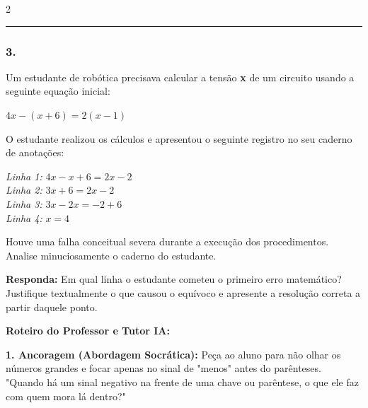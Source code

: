 \begin{multicols*}{2}
\par\vspace{\espacoQuestao}


\noindent\textcolor{CorLinha}{\rule{\linewidth}{0.5pt}}
\par\vspace{\espacoPreQuestao}
\subsubsection*{3.} 
\begin{enunciadoLiteral}
Um estudante de robótica precisava calcular a tensão \textbf{x} de um circuito usando a seguinte equação inicial:

$ 4x - (x + 6) = 2(x - 1) $

O estudante realizou os cálculos e apresentou o seguinte registro no seu caderno de anotações:

\textit{Linha 1:} $ 4x - x + 6 = 2x - 2 $ \\
\textit{Linha 2:} $ 3x + 6 = 2x - 2 $ \\
\textit{Linha 3:} $ 3x - 2x = -2 + 6 $ \\
\textit{Linha 4:} $ x = 4 $

Houve uma falha conceitual severa durante a execução dos procedimentos. Analise minuciosamente o caderno do estudante.

\begin{boxresponda}
\textbf{Responda:} Em qual linha o estudante cometeu o primeiro erro matemático? Justifique textualmente o que causou o equívoco e apresente a resolução correta a partir daquele ponto.
\end{boxresponda}
\end{enunciadoLiteral}

\ifgabarito
    \begin{tcolorbox}[colback=CorTitUm!5, colframe=CorTitUm, boxrule=1pt, arc=4pt, left=6pt, right=6pt, top=6pt, bottom=6pt]
    \small\textbf{\textcolor{CorTitUm}{Roteiro do Professor e Tutor IA:}}\par\vspace{0.1cm}
    \color{CinzaEscuro}
    \textbf{1. Ancoragem (Abordagem Socrática):} Peça ao aluno para não olhar os números grandes e focar apenas no sinal de "menos" antes do parênteses. "Quando há um sinal negativo na frente de uma chave ou parêntese, o que ele faz com quem mora lá dentro?"\par\vspace{0.1cm}
    

\end{tcolorbox}
\end{multicols*}
